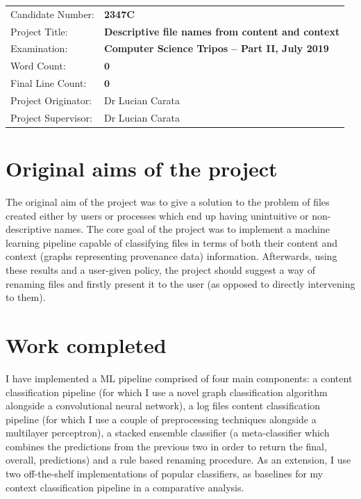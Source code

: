 \documentclass[12pt,a4paper,oneside]{report}
\begin{document}
{\large
  \begin{tabular}{ll}
    Candidate Number:   & \bf 2347C                          \\
    Project Title:      & \bf Descriptive file names from content and context \\
    Examination:        & \bf Computer Science Tripos -- Part II, July 2019   \\
    Word Count:         & \bf $\mathbf{0}$\footnotemark[1]                    \\
    Final Line Count:   & \bf $\mathbf{0}$\footnotemark[2]                    \\
    Project Originator: & Dr Lucian Carata                                    \\
    Project Supervisor: & Dr Lucian Carata                                    \\
  \end{tabular}
}




\section*{Original aims of the project}

The original aim of the project was to give a solution to the problem of files created either by users or processes which end up having unintuitive or non-descriptive names. The core goal of the project was to implement a machine learning pipeline capable of classifying files in terms of both their content and context (graphs representing provenance data) information. Afterwards, using these results and a user-given policy, the project should suggest a way of renaming files and firstly present it to the user (as opposed to directly intervening to them).

\section*{Work completed}
I have implemented a ML pipeline comprised of four main components: a content classification pipeline (for which I use a novel graph classification algorithm alongside a convolutional neural network), a log files content classification pipeline (for which I use a couple of preprocessing techniques alongside a multilayer perceptron), a stacked ensemble classifier (a meta-classifier which combines the predictions from the previous two in order to return the final, overall, predictions) and a rule based renaming procedure. As an extension, I use two off-the-shelf implementations of popular classifiers, as baselines for my context classification pipeline in a comparative analysis. 
\end{document}
